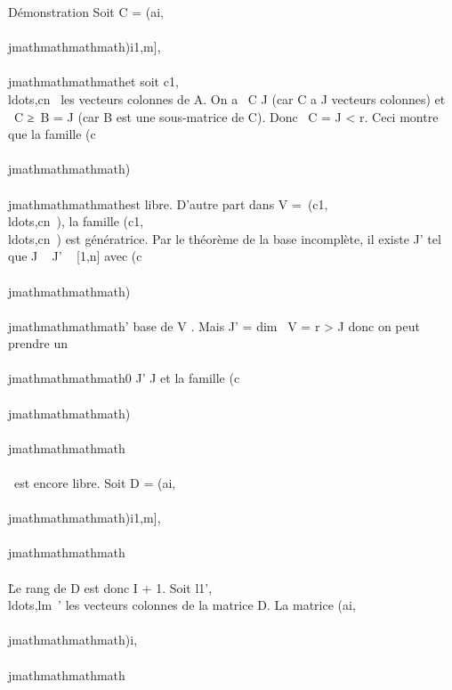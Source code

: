 Démonstration Soit C = (ai,\\\\jmathmathmathmath)i\in{[}1,m{]},\\\\jmathmathmathmath\inJ et soit
c1,\\ldots,cn~
les vecteurs colonnes de A. On a
\mathrmrg~C
\leq\textbar{}J\textbar{} (car C a \textbar{}J\textbar{} vecteurs colonnes)
et \mathrmrg~C
≥\mathrmrg~B =
\textbar{}J\textbar{} (car B est une sous-matrice de C). Donc
\mathrmrg~C =
\textbar{}J\textbar{} \textless{} r. Ceci montre que la famille
(c\\\\jmathmathmathmath)\\\\jmathmathmathmath\inJ est libre. D'autre part dans V
=\
\mathrmVect(c1,\\ldots,cn~),
la famille
(c1,\\ldots,cn~)
est génératrice. Par le théorème de la base incomplète, il existe J' tel
que J \subset~ J' \subset~ {[}1,n{]} avec (c\\\\jmathmathmathmath)\\\\jmathmathmathmath\inJ' base de V .
Mais \textbar{}J'\textbar{} = dim~ V = r
\textgreater{} \textbar{}J\textbar{} donc on peut prendre un
\\\\jmathmathmathmath0 ' \diagdown J et la famille
(c\\\\jmathmathmathmath)\\\\jmathmathmathmath\inJ\cup\\\\\
est encore libre. Soit D =
(ai,\\\\jmathmathmathmath)i\in{[}1,m{]},\\\\jmathmathmathmath\inJ\cup\\\\\.
Le rang de D est donc \textbar{}I\textbar{} + 1. Soit
l1',\\ldots,lm~'
les vecteurs colonnes de la matrice D. La matrice
(ai,\\\\jmathmathmathmath)i\inI,\\\\jmathmathmathmath\inJ\cup\\\\\
